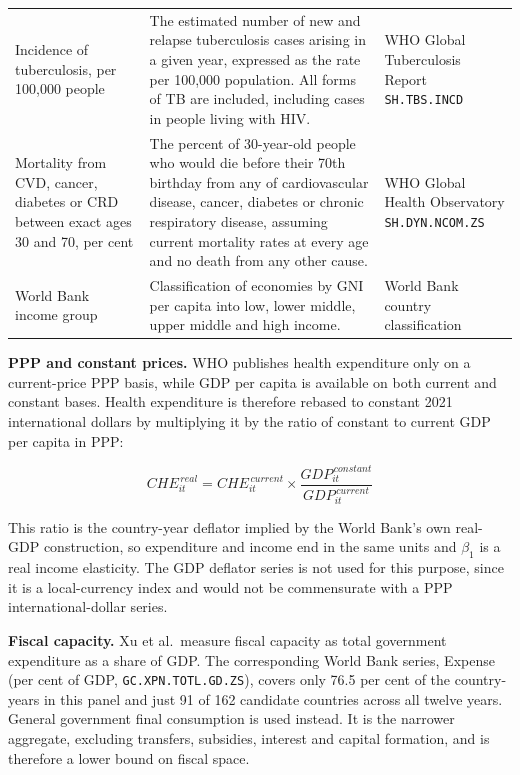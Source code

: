 \documentclass[11pt,a4paper]{article}
\begin{document}
\begin{table}[H]
\begin{tabularx}{\textwidth}{@{}>{\raggedright\arraybackslash}p{} >{\raggedright\arraybackslash}X >{\raggedright\arraybackslash}p{}@{}}
Incidence of tuberculosis, per 100,000 people
& The estimated number of new and relapse tuberculosis cases arising in a given
  year, expressed as the rate per 100,000 population. All forms of TB are
  included, including cases in people living with HIV.
& WHO Global Tuberculosis Report \newline \texttt{SH.TBS.INCD} \\
\addlinespace

Mortality from CVD, cancer, diabetes or CRD between exact ages 30 and 70, per
cent
& The percent of 30-year-old people who would die before their 70th birthday from
  any of cardiovascular disease, cancer, diabetes or chronic respiratory disease,
  assuming current mortality rates at every age and no death from any other
  cause.
& WHO Global Health Observatory \newline \texttt{SH.DYN.NCOM.ZS} \\
\addlinespace

World Bank income group
& Classification of economies by GNI per capita into low, lower middle, upper
  middle and high income.
& World Bank country classification \\

\bottomrule
\end{tabularx}
\end{table}

\textbf{PPP and constant prices.} WHO publishes health expenditure only on a
current-price PPP basis, while GDP per capita is available on both current and
constant bases. Health expenditure is therefore rebased to constant 2021
international dollars by multiplying it by the ratio of constant to current GDP
per capita in PPP:

\begin{equation*}
\mathit{CHE}^{\,real}_{it}
  = \mathit{CHE}^{\,current}_{it}
    \times \frac{\mathit{GDP}^{\,constant}_{it}}{\mathit{GDP}^{\,current}_{it}}
\end{equation*}

This ratio is the country-year deflator implied by the World Bank's own real-GDP
construction, so expenditure and income end in the same units and $\beta_1$ is a
real income elasticity. The GDP deflator series is not used for this purpose,
since it is a local-currency index and would not be commensurate with a PPP
international-dollar series.

\textbf{Fiscal capacity.} Xu et al.\ measure fiscal capacity as total government
expenditure as a share of GDP. The corresponding World Bank series, Expense
(per cent of GDP, \texttt{GC.XPN.TOTL.GD.ZS}), covers only 76.5 per cent of the
country-years in this panel and just 91 of 162 candidate countries across all
twelve years. General government final consumption is used instead. It is the
narrower aggregate, excluding transfers, subsidies, interest and capital
formation, and is therefore a lower bound on fiscal space.
\end{document}
